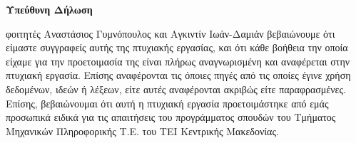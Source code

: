 \thispagestyle{plain}
\begin{center}
    \Large
    \textbf{Υπεύθυνη Δήλωση}
\end{center}
 φοιτητές Αναστάσιος Γυμνόπουλος και Αγκιντίν Ιωάν-Δαμιάν βεβαιώνουμε ότι είμαστε συγγραφείς αυτής της πτυχιακής εργασίας, και ότι κάθε βοήθεια την οποία είχαμε για την προετοιμασία της είναι πλήρως αναγνωρισμένη και αναφέρεται στην πτυχιακή
εργασία. Επίσης αναφέρονται τις όποιες πηγές από τις οποίες έγινε χρήση δεδομένων, ιδεών
ή λέξεων, είτε αυτές αναφέρονται ακριβώς είτε παραφρασμένες. Επίσης, βεβαιώνουμαι ότι αυτή
η πτυχιακή εργασία προετοιμάστηκε από εμάς προσωπικά ειδικά για τις απαιτήσεις του προγράμματος σπουδών του Τμήματος Μηχανικών Πληροφορικής Τ.Ε. του ΤΕΙ Κεντρικής Μακεδονίας.